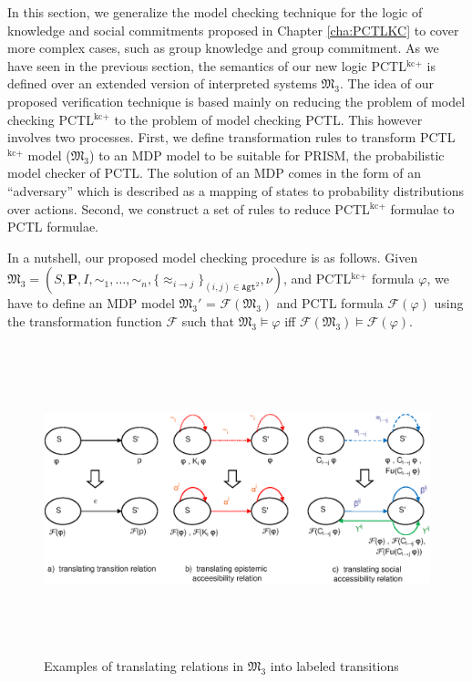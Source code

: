In this section, we generalize the model checking technique for
the logic of knowledge and social commitments proposed in
Chapter \ref{cha:PCTLKC} to cover more complex cases, such as group
knowledge and group commitment. As we have seen in the previous
section, the semantics of our new logic PCTL$^{\textrm{kc+}}$ is
defined over an extended version of interpreted systems
$\mathfrak{M_3}$. The idea of our proposed verification technique is
based mainly on reducing the problem of model checking
PCTL$^{\textrm{kc+}}$ to the problem of model checking PCTL. This
however involves two processes. First, we define transformation
rules to transform PCTL$^{\textrm{kc+}}$ model ($\mathfrak{M_3}$) to
an MDP model to be suitable for PRISM, the probabilistic model
checker of PCTL. The solution of an MDP comes in the form of an
``adversary'' \cite{Forejt2011} which is described as a mapping
of states to probability distributions over actions. Second, we
construct a set of rules to reduce PCTL$^{\textrm{kc+}}$ formulae
to PCTL formulae.

In a nutshell, our proposed model checking procedure is as follows. Given $\mathfrak{M_3}=(S,\textbf{P},I,\sim_1, \ldots
,\sim_n,\{\approx_{i \rightarrow j}\}_{{(i,j)}\in \texttt{Agt}^2},\nu)$, and PCTL$^{\textrm{kc+}}$ formula $\varphi$, we have to define an MDP model $\mathfrak{M_3'}$ = $\mathscr{F}(\mathfrak{M_3})$ and PCTL formula $\mathscr{F}(\varphi)$ using the transformation function $\mathscr{F}$ such that $\mathfrak{M_3} \models \varphi$ iff $\mathscr{F}(\mathfrak{M_3})\models \mathscr{F}(\varphi)$.


\begin{figure}[h]
\centering
\includegraphics[width=15cm, height=9cm]{chap5/img/relation-translation-cha5.eps}
\caption{Examples of translating relations in $\mathfrak{M_3}$ into labeled transitions} \label{fig:relation-translation-cha5}
\end{figure}

